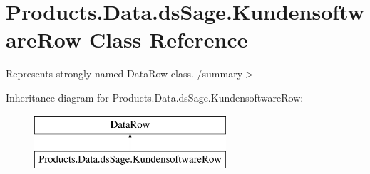 \hypertarget{class_products_1_1_data_1_1ds_sage_1_1_kundensoftware_row}{}\section{Products.\+Data.\+ds\+Sage.\+Kundensoftware\+Row Class Reference}
\label{class_products_1_1_data_1_1ds_sage_1_1_kundensoftware_row}


Represents strongly named Data\+Row class. /summary$>$  


Inheritance diagram for Products.\+Data.\+ds\+Sage.\+Kundensoftware\+Row\+:\begin{figure}[H]
\begin{center}
\leavevmode
\includegraphics[height=2.000000cm]{class_products_1_1_data_1_1ds_sage_1_1_kundensoftware_row}
\end{center}
\end{figure}
